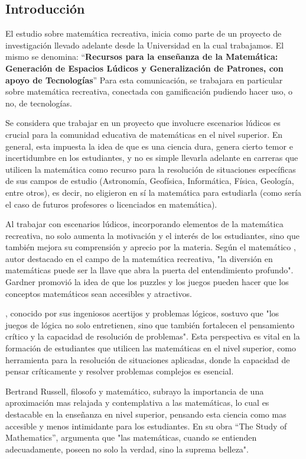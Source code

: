 \subsection{Introducción}

El estudio sobre matemática recreativa, inicia como parte de un proyecto de investigación llevado adelante desde la Universidad en la cual trabajamos. El mismo se denomina: “\textbf{Recursos para la enseñanza de la Matemática: Generación de Espacios Lúdicos y Generalización de Patrones, con apoyo de Tecnologías}” Para esta comunicación, se trabajara en particular sobre matemática recreativa, conectada con gamificación pudiendo hacer uso, o no, de tecnologías.

Se considera que trabajar en un proyecto que involucre escenarios lúdicos es crucial para la comunidad educativa de matemáticas en el nivel superior. En general, esta impuesta la idea de que es una ciencia dura, genera cierto temor e incertidumbre en los estudiantes, y no es simple llevarla adelante en carreras que utilicen la matemática como recurso para la resolución de situaciones específicas de sus campos de estudio (Astronomía, Geofísica, Informática, Física, Geología, entre otros), es decir, no eligieron en sí la matemática para estudiarla (como sería el caso de futuros profesores o licenciados en matemática).

Al trabajar con escenarios lúdicos, incorporando elementos de la matemática recreativa, no solo aumenta la motivación y el interés de los estudiantes, sino que también mejora su comprensión y aprecio por la materia. Según el matemático \textcite{gardner2006}, autor destacado en el campo de la matemática recreativa, "la diversión en matemáticas puede ser la llave que abra la puerta del entendimiento profundo". Gardner promovió la idea de que los puzzles y los juegos pueden hacer que los conceptos matemáticos sean accesibles y atractivos.

\textcite{smullyan1980}, conocido por sus ingeniosos acertijos y problemas lógicos, sostuvo que "los juegos de lógica no solo entretienen, sino que también fortalecen el pensamiento crítico y la capacidad de resolución de problemas". Esta perspectiva es vital en la formación de estudiantes que utilicen las matemáticas en el nivel superior, como herramienta para la resolución de situaciones aplicadas, donde la capacidad de pensar críticamente y resolver problemas complejos es esencial.

Bertrand Russell, filosofo y matemático, subrayo la importancia de una aproximación mas relajada y contemplativa a las matemáticas, lo cual es destacable en la enseñanza en nivel superior, pensando esta ciencia como mas accesible y menos intimidante para los estudiantes. En su obra ``The Study of Mathematics'', \textcite{russell1919} argumenta que "las matemáticas, cuando se entienden adecuadamente, poseen no solo la verdad, sino la suprema belleza".

